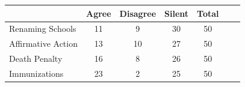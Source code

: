 \begin{tabular}{l*{6}c}\toprule 
& Agree & Disagree & Silent & Total \\
\midrule
Renaming Schools & 11 &  9 & 30 & 50 \\
Affirmative Action & 13 & 10 & 27 & 50 \\
Death Penalty & 16 &  8 & 26 & 50 \\
Immunizations & 23 &  2 & 25 & 50 \\
\bottomrule
\end{tabular}
